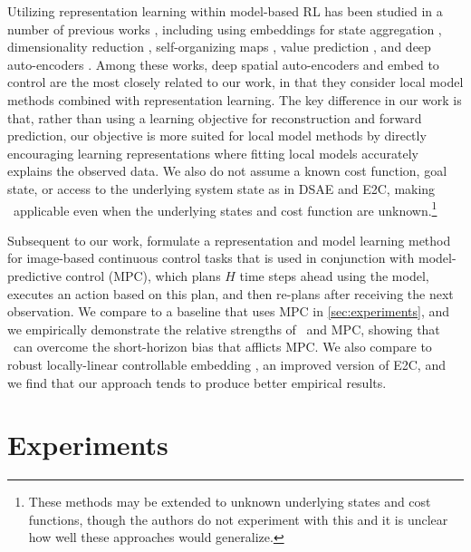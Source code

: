 Utilizing representation learning within model-based RL has been studied in a number of previous works \citep{srl-survey}, including using embeddings for state aggregation \citep{soft-state-aggregation}, dimensionality reduction \citep{dimension-reduction}, self-organizing maps \citep{self-organizing-map}, value prediction \citep{vpn}, and deep auto-encoders \citep{ae-nn,darla}. Among these works, deep spatial auto-encoders \citep[DSAE; ][]{spatial-ae} and embed to control \citep[E2C; ][]{e2c,rce} are the most closely related to our work, in that they consider local model methods combined with representation learning. The key difference in our work is that, rather than using a learning objective for reconstruction and forward prediction, our objective is more suited for local model methods by directly encouraging learning representations where fitting local models accurately explains the observed data. We also do not assume a known cost function, goal state, or access to the underlying system state as in DSAE and E2C, making \metabbr\ applicable even when the underlying states and cost function are unknown.\footnote{These methods may be extended to unknown underlying states and cost functions, though the authors do not experiment with this and it is unclear how well these approaches would generalize.}

Subsequent to our work, \citet{planet} formulate a representation and model learning method for image-based continuous control tasks that is used in conjunction with model-predictive control (MPC), which plans $H$ time steps ahead using the model, executes an action based on this plan, and then re-plans after receiving the next observation. We compare to a baseline that uses MPC in \autoref{sec:experiments}, and we empirically demonstrate the relative strengths of \metabbr\ and MPC, showing that \metabbr\ can overcome the short-horizon bias that afflicts MPC. We also compare to robust locally-linear controllable embedding \citep[RCE; ][]{rce}, an improved version of E2C, and we find that our approach tends to produce better empirical results.


\section{Experiments}
\label{sec:solar-experiments}

